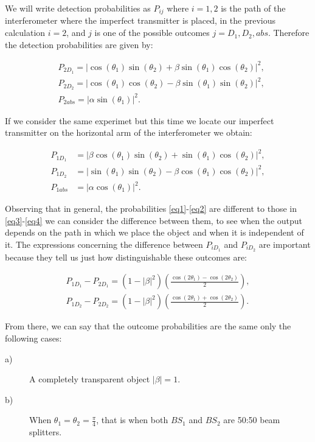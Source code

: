 \documentclass{book}
\begin{document}
We will write detection probabilities as $P_{ij}$ where $i=1,2$ is the path of the interferometer where the imperfect transmitter is placed, in the previous calculation $i=2$, and $j$ is one of the possible outcomes $j=D_{1},D_{2},abs$. Therefore the detection probabilities are given by:

\begin{align}
& P_{2D_{1}}=|\cos(\theta_{1})\sin(\theta_{2})+\beta \sin(\theta_{1})\cos(\theta_{2})|^2, \label{eq1}\\
& P_{2D_{2}}=|\cos(\theta_{1})\cos(\theta_{2})-\beta \sin(\theta_{1})\sin(\theta_{2})|^2, \\
& P_{2abs}=|\alpha \sin(\theta_{1})|^2. \label{eq2}
\end{align}

If we consider the same experimet but this time we locate our imperfect transmitter on the horizontal arm of the interferometer we obtain:

\begin{align}
P_{1D_{1}}&=|\beta\cos(\theta_{1})\sin(\theta_{2}) +\sin(\theta_{1})\cos(\theta_{2})|^2,\label{eq3} \\
P_{1D_{2}}&=|\sin(\theta_{1})\sin(\theta_{2})-\beta \cos(\theta_{1})\cos(\theta_{2})|^2,\\
P_{1abs}&=|\alpha \cos(\theta_{1})|^2. \label{eq4}
\end{align}



Observing that in general, the probabilities \ref{eq1}-\ref{eq2} are different to those in \ref{eq3}-\ref{eq4} we can consider  the difference between them, to see when the output depends on the path in which we place the object and when it is independent of it. The expressions concerning the difference between $P_{iD_{1}}$ and $P_{iD_{2}}$ are important because they tell us just how distinguishable these outcomes are:


\begin{align}
P_{1D_{1}}-P_{2D_{1}}=(1-|\beta|^2)\left(\frac{\cos(2 \theta_{1})-\cos(2 \theta_{2})}{2}\right), \\
P_{1D_{2}}-P_{2D_{2}}=(1-|\beta|^2)\left(\frac{\cos(2 \theta_{1})+\cos(2 \theta_{2})}{2}\right).
\end{align}

From there, we can say that the outcome probabilities are the same only the following cases:

\begin{description}

\item[a)] A completely transparent object $|\beta|=1$.

\item[b)] When $\theta_{1}=\theta_{2}=\frac{\pi}{4}$, that is when both $BS_{1}$ and $BS_{2}$ are 50:50 beam splitters.
\end{description}
\end{document}
